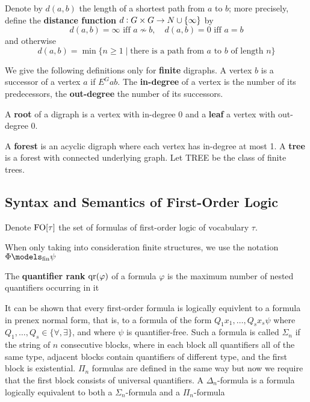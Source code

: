 \documentclass[11pt]{article}
\begin{document}
Denote by \(d(a,b)\) the length of a shortest path from \(a\) to \(b\); more
precisely, define the \textbf{distance function} \(d:G\times G\to\relax{N}\cup\{\infty\}\)
by
\begin{equation*}
d(a,b)=\infty\text{ iff }a\not\sim b,\quad d(a,b)=0\text{ iff }a=b
\end{equation*}
and otherwise
\begin{equation*}
d(a,b)=\min\{n\ge1\mid\text{there is a path from $a$ to $b$ of length $n$}\}
\end{equation*}

We give the following definitions only for \textbf{finite} digraphs. A vertex \(b\)
is a successor of a vertex \(a\) if \(E^Gab\). The \textbf{in-degree} of a vertex is
the number of its predecessors, the \textbf{out-degree} the number of its
successors.

A \textbf{root} of a digraph is a vertex with in-degree 0 and a \textbf{leaf} a vertex with
out-degree 0.

A \textbf{forest} is an acyclic digraph where each vertex has in-degree at most 1. A
\textbf{tree} is a forest with connected underlying graph. Let TREE be the class of
finite trees.

\subsection{Syntax and Semantics of First-Order Logic}
\label{sec:org16bb348}
Denote \(\operatorname{FO}[\tau]\) the set of formulas of first-order logic of vocabulary
\(\tau\).

When only taking into consideration finite structures, we use the notation
\(\Phi\models_{\fin}\psi\)

The \textbf{quantifier rank} \(\operatorname{qr}(\varphi)\) of a formula \(\varphi\) is the maximum
number of nested quantifiers occurring in it

It can be shown that every first-order formula is logically equivlent to a
formula in prenex normal form, that is, to a formula of the form
\(Q_1x_1,\dots,Q_sx_s\psi\) where \(Q_1,\dots,Q_s\in\{\forall,\exists\}\),
and where \(\psi\) is quantifier-free. Such a formula is called \(\Sigma_n\) if
the string of \(n\) consecutive blocks, where in each block all quantifiers
all of the same type, adjacent blocks contain quantifiers of different type,
and the first block is existential. \(\Pi_n\) formulas are defined in the
same way but now we require that the first block consists of universal
quantifiers. A \(\Delta_n\)-formula is a formula logically equivalent to
both a \(\Sigma_n\)-formula and a \(\Pi_n\)-formula
\end{document}
